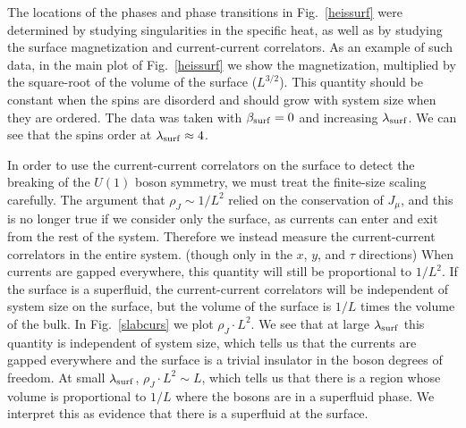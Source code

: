 \documentclass[prb,twocolumn]{revtex4-1}
\begin{document}
The locations of the phases and phase transitions in Fig.~\ref{heissurf} were determined by studying singularities in the specific heat, as well as by studying the surface magnetization and current-current correlators. As an example of such data, in the main plot of Fig.~\ref{heissurf} we show the magnetization, multiplied by the square-root of the volume of the surface ($L^{3/2}$). This quantity should be constant when the spins are disorderd and should grow with system size when they are ordered. The data was taken with $\beta_{\rm surf}=0$ and increasing $\lambda_{\rm surf}$. We can see that the spins order at $\lambda_{\rm surf}\approx4$. 

In order to use the current-current correlators on the surface to detect the breaking of the $U(1)$ boson symmetry, we must treat the finite-size scaling carefully. 
The argument that $\rho_J\sim 1/L^2$ relied on the conservation of $J_\mu$, and this is no longer true if we consider only the surface, as currents can enter and exit from the rest of the system. Therefore we instead measure the current-current correlators in the entire system. (though only in the $x$, $y$, and $\tau$ directions) When currents are gapped everywhere, this quantity will still be proportional to $1/L^2$. If the surface is a superfluid, the current-current correlators will be independent of system size on the surface, but the volume of the surface is $1/L$ times the volume of the bulk. In Fig.~\ref{slabcurs} we plot $\rho_J\cdot L^2$. We see that at large $\lambda_{\rm surf}$ this quantity is independent of system size, which tells us that the currents are gapped everywhere and the surface is a trivial insulator in the boson degrees of freedom. At small $\lambda_{\rm surf}$, $\rho_J\cdot L^2 \sim L$, which tells us that there is a region whose volume is proportional to $1/L$ where the bosons are in a superfluid phase. We interpret this as evidence that there is a superfluid at the surface.
\end{document}
